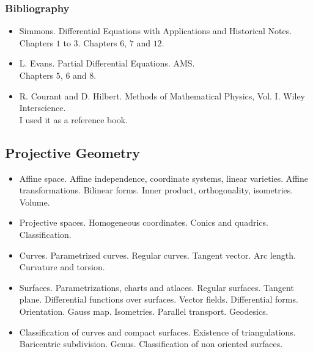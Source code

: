 \documentclass[spanish]{article}
\begin{document}
\subsubsection{Bibliography}
\begin{itemize}
  \item Simmons. Differential Equations with Applications and Historical Notes.\\
    Chapters $1$ to $3$. Chapters $6$, $7$ and $12$.

  \item L. Evans. Partial Differential Equations. AMS.\\
    Chapters $5$, $6$ and $8$.

  \item R. Courant and D. Hilbert. Methods of Mathematical Physics, Vol. I. Wiley Interscience.\\
    I used it as a reference book.

\end{itemize}


\hrulefill%

\subsection{Projective Geometry}

\begin{itemize}
  \item
Affine space. Affine independence, coordinate systems, linear varieties.
Affine transformations. Bilinear forms. Inner product, orthogonality,
isometries. Volume.

  \item
Projective spaces. Homogeneous coordinates. Conics and quadrics. Classification.

  \item
Curves. Parametrized curves. Regular curves. Tangent vector. Arc length. Curvature
and torsion.

  \item
Surfaces. Parametrizations, charts and atlaces. Regular surfaces. Tangent plane.
Differential functions over surfaces. Vector fields. Differential forms. Orientation.
Gauss map. Isometries. Parallel transport. Geodesics.

  \item
Classification of curves and compact surfaces. Existence of triangulations.
Baricentric subdivision. Genus. Classification of non oriented surfaces.

\end{itemize}
\end{document}
